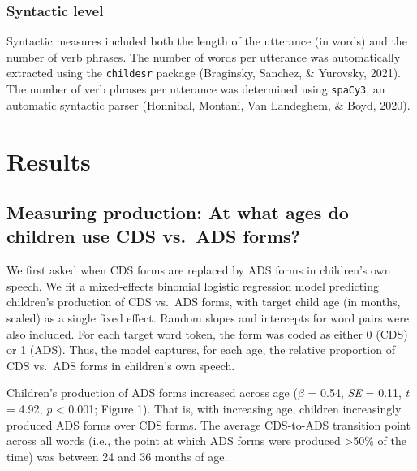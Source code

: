 \documentclass[10pt, letterpaper]{article}
\begin{document}
\hypertarget{syntactic-level}{%
\subsubsection{Syntactic level}\label{syntactic-level}}

Syntactic measures included both the length of the utterance (in words)
and the number of verb phrases. The number of words per utterance was
automatically extracted using the \texttt{childesr} package (Braginsky,
Sanchez, \& Yurovsky, 2021). The number of verb phrases per utterance
was determined using \texttt{spaCy3}, an automatic syntactic parser
(Honnibal, Montani, Van Landeghem, \& Boyd, 2020).

\hypertarget{results}{%
\section{Results}\label{results}}

\hypertarget{measuring-production-at-what-ages-do-children-use-cds-vs.-ads-forms}{%
\subsection{Measuring production: At what ages do children use CDS
vs.~ADS
forms?}\label{measuring-production-at-what-ages-do-children-use-cds-vs.-ads-forms}}

We first asked when CDS forms are replaced by ADS forms in children's
own speech. We fit a mixed-effects binomial logistic regression model
predicting children's production of CDS vs.~ADS forms, with target child
age (in months, scaled) as a single fixed effect. Random slopes and
intercepts for word pairs were also included. For each target word
token, the form was coded as either 0 (CDS) or 1 (ADS). Thus, the model
captures, for each age, the relative proportion of CDS vs.~ADS forms in
children's own speech.

Children's production of ADS forms increased across age (\(\beta\) =
0.54, \emph{SE} = 0.11, \emph{t} = 4.92, \emph{p} \textless{} 0.001;
Figure 1). That is, with increasing age, children increasingly produced
ADS forms over CDS forms. The average CDS-to-ADS transition point across
all words (i.e., the point at which ADS forms were produced
\textgreater50\% of the time) was between 24 and 36 months of age.
\end{document}
